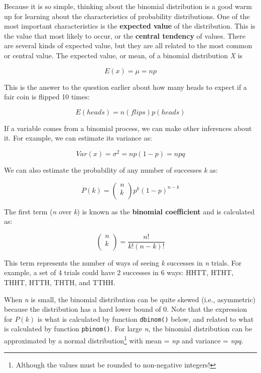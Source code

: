 \documentclass[
  13,
  letterpaper,
]{report}
\begin{document}
Because it is so simple, thinking about the binomial distribution is a
good warm up for learning about the characteristics of probability
distributions. One of the most important characteristics is the
\textbf{expected value} of the distribution. This is the value that most
likely to occur, or the \textbf{central tendency} of values. There are
several kinds of expected value, but they are all related to the most
common or central value. The expected value, or mean, of a binomial
distribution \emph{X} is

\[E\left(x\right)=\mu=np\]

This is the answer to the question earlier about how many heads to
expect if a fair coin is flipped 10 times:

\[E(heads)=n(flips)p(heads)\]

If a variable comes from a binomial process, we can make other
inferences about it. For example, we can estimate its variance as:

\[Var\left(x\right)=\sigma^2=np(1-p)=npq\]

We can also estimate the probability of any number of successes \emph{k}
as:

\[P\left(k\right)=\left(\begin{matrix}n\\k\\\end{matrix}\right)p^k\left(1-p\right)^{n-k}\]

The first term (\emph{n} over \emph{k}) is known as the \textbf{binomial
coefficient} and is calculated as:

\[\left(\begin{matrix}n\\k\\\end{matrix}\right)=\frac{n!}{k!\left(n-k\right)!}\]

This term represents the number of ways of seeing \emph{k} successes in
\emph{n} trials. For example, a set of 4 trials could have 2 successes
in 6 ways: HHTT, HTHT, THHT, HTTH, THTH, and TTHH.

When \emph{n} is small, the binomial distribution can be quite skewed
(i.e., asymmetric) because the distribution has a hard lower bound of 0.
Note that the expression for \(P(k)\) is what is calculated by function
\texttt{dbinom()} below, and related to what is calculated by function
\texttt{pbinom()}. For large \emph{n}, the binomial distribution can be
approximated by a normal distribution\footnote{Although the values must
  be rounded to non-negative integers!} with mean = \emph{np} and
variance = \emph{npq}.
\end{document}

